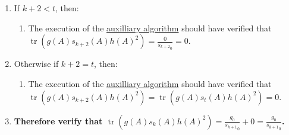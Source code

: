 \documentclass[twocolumn]{article}
\DeclareMathOperator{\tr}{tr}
\begin{document}
\begin{enumerate}
\begin{enumerate}
						\item If $k+2<t$, then:
						\begin{enumerate}
							\item The execution of the \hyperref[sec:algorithm 47 auxilliary algorithm]{auxilliary algorithm} should have verified that $\tr(g(A)s_{k+2}(A)h(A)^2)=\frac{0}{{s_{k+2}}_0}=0$.
						\end{enumerate}
						\item Otherwise if $k+2=t$, then:
						\begin{enumerate}
							\item The execution of the \hyperref[sec:algorithm 47 auxilliary algorithm]{auxilliary algorithm} should have verified that $\tr(g(A)s_{k+2}(A)h(A)^2)=\tr(g(A)s_t(A)h(A)^2)=0$.
						\end{enumerate}
						\item \textbf{Therefore verify that $\tr(g(A)s_k(A)h(A)^2)=\frac{g_0}{{s_{k+1}}_0}+0=\frac{g_0}{{s_{k+1}}_0}$.}
					\end{enumerate}
				\end{enumerate}
\end{document}
